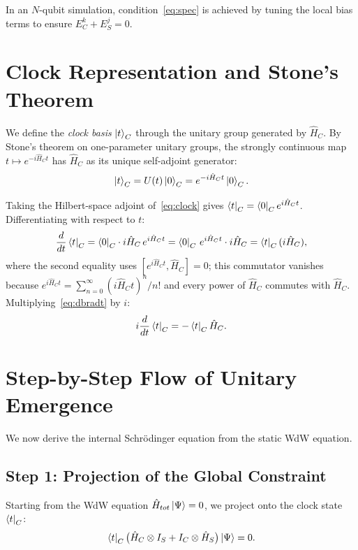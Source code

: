 \documentclass[11pt,a4paper]{article}
\theoremstyle{definition}
\theoremstyle{remark}
\begin{document}
In an $N$-qubit simulation, condition~\eqref{eq:spec} is achieved by tuning the local bias
terms to ensure $E_C^k+E_S^j=0$.

\section{Clock Representation and Stone's Theorem}

We define the \emph{clock basis} $\ket{t}_C$ through the unitary group generated by $\hat{H}_C$.
By Stone's theorem on one-parameter unitary groups, the strongly continuous map
$t\mapsto e^{-i\hat{H}_C t}$ has $\hat{H}_C$ as its unique self-adjoint generator:
\begin{equation}\label{eq:clock}
  \ket{t}_C = U(t)\ket{0}_C = e^{-i\hat{H}_C t}\ket{0}_C.
\end{equation}

Taking the Hilbert-space adjoint of~\eqref{eq:clock} gives $\bra{t}_C=\bra{0}_C e^{i\hat{H}_C t}$.
Differentiating with respect to $t$:
\begin{equation}\label{eq:dbradt}
  \frac{d}{dt}\bra{t}_C
    = \bra{0}_C\cdot i\hat{H}_C\,e^{i\hat{H}_C t}
    = \bra{0}_C\,e^{i\hat{H}_C t}\cdot i\hat{H}_C
    = \bra{t}_C(i\hat{H}_C),
\end{equation}
where the second equality uses $[e^{i\hat{H}_C t},\hat{H}_C]=0$; this commutator vanishes
because $e^{i\hat{H}_C t}=\sum_{n=0}^\infty(i\hat{H}_C t)^n/n!$ and every power of $\hat{H}_C$
commutes with $\hat{H}_C$.
Multiplying~\eqref{eq:dbradt} by $i$:
\begin{equation}\label{eq:idbra}
  i\frac{d}{dt}\bra{t}_C = -\bra{t}_C\hat{H}_C.
\end{equation}

\section{Step-by-Step Flow of Unitary Emergence}

We now derive the internal Schr\"odinger equation from the static WdW equation.

\subsection*{Step 1: Projection of the Global Constraint}
Starting from the WdW equation $\hat{H}_{tot}\ket{\Psi}=0$, we project onto the clock state
$\bra{t}_C$:
\begin{equation}\label{eq:proj}
  \bra{t}_C\bigl(\hat{H}_C\otimes I_S+I_C\otimes\hat{H}_S\bigr)\ket{\Psi}=0.
\end{equation}
\end{document}
